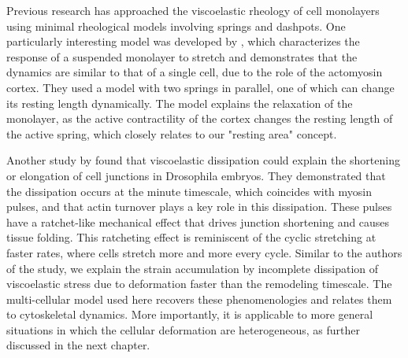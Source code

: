 

Previous research has approached the viscoelastic rheology of cell monolayers using minimal rheological models involving springs and dashpots. One particularly interesting model was developed by \citet{khalilgharibi2019}, which characterizes the response of a suspended monolayer to stretch and demonstrates that the dynamics are similar to that of a single cell, due to the role of the actomyosin cortex. They used a model with two springs in parallel, one of which can change its resting length dynamically. The model explains the relaxation of the monolayer, as the active contractility of the cortex changes the resting length of the active spring, which closely relates to our "resting area" concept. 

Another study by \citet{clement2017} found that viscoelastic dissipation could explain the shortening or elongation of cell junctions in Drosophila embryos. They demonstrated that the dissipation occurs at the minute timescale, which coincides with myosin pulses, and that actin turnover plays a key role in this dissipation. These pulses have a ratchet-like mechanical effect that drives junction shortening and causes tissue folding. This ratcheting effect is reminiscent of the cyclic stretching at faster rates, where cells stretch more and more every cycle. Similar to the authors of the study, we explain the strain accumulation by incomplete dissipation of viscoelastic stress due to deformation faster than the remodeling timescale.
The multi-cellular model used here recovers these phenomenologies and relates them to cytoskeletal dynamics. More importantly, it is applicable to more general situations in which the cellular deformation are heterogeneous, as further discussed in the next chapter. 

